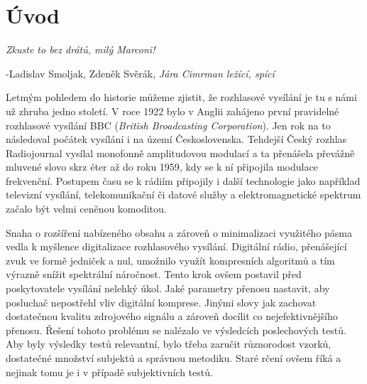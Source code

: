 \chapter{Úvod}
\label{chap:introduction}

\epigraph{\hfill\textit{Zkuste to bez drátů, milý Marconi!}}{-Ladislav Smoljak, Zdeněk Svěrák, \textit{Jára Cimrman ležící, spící}}

Letmým pohledem do historie můžeme zjistit, že rozhlasové vysílání je tu s námi už zhruba jedno století. V roce 1922 bylo v Anglii zahájeno první pravidelné rozhlasové vysílání BBC (\textit{British Broadcasting Corporation}). Jen rok na to následoval počátek vysílání i na území Československa. Tehdejší Český rozhlas Radiojournal vysílal monofonně amplitudovou modulací a ta přenášela převážně mluvené slovo skrz éter až do roku 1959, kdy se k ní připojila modulace frekvenční.\cite{web:cro} Postupem času se k rádiím připojily i další technologie jako například televizní vysílání, telekomunikační či datové služby a elektromagnetické spektrum začalo být velmi ceněnou komoditou.

Snaha o rozšíření nabízeného obsahu a zároveň o minimalizaci využitého pásma vedla k myšlence digitalizace rozhlasového vysílání. Digitální rádio, přenášející zvuk ve formě jedniček a nul, umožnilo využít kompresních algoritmů a tím výrazně snížit spektrální náročnost. Tento krok ovšem postavil před poskytovatele vysílání nelehký úkol. Jaké parametry přenosu nastavit, aby posluchač nepostřehl vliv digitální komprese. Jinými slovy jak zachovat dostatečnou kvalitu zdrojového signálu a zároveň docílit co nejefektivnějšího přenosu. Řešení tohoto problému se nalézalo ve výsledcích poslechových testů. Aby byly výsledky testů relevantní, bylo třeba zaručit různorodost vzorků, dostatečné množství subjektů a správnou metodiku. Staré rčení ovšem říká  a nejinak tomu je i v případě subjektivních testů. 


